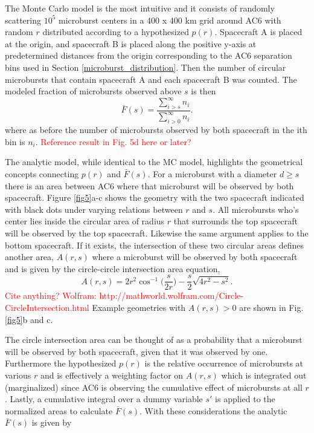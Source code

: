 \documentclass[draft]{agujournal2019}
\begin{document}
The Monte Carlo model is the most intuitive and it consists of randomly scattering $10^5$ microburst centers in a 400 x 400 km grid around AC6 with random $r$ distributed according to a hypothesized $p(r)$. Spacecraft A is placed at the origin, and spacecraft B is placed along the positive y-axis at predetermined distances from the origin corresponding to the AC6 separation bins used in Section \ref{microburst_distribution}. Then the number of circular microbursts that contain spacecraft A and each spacecraft B was counted. The modeled fraction of microbursts observed above $s$ is then
\begin{equation}
\bar{F}(s) = \frac{\displaystyle\sum_{i > s}^\infty n_{i} }{ \displaystyle\sum_{i > 0}^\infty n_{i} }.
\end{equation} where as before the number of microbursts observed by both spacecraft in the ith bin is $n_{i}$. \textcolor{red}{Reference result in Fig. 5d here or later?}

The analytic model, while identical to the MC model, highlights the geometrical concepts connecting $p(r)$ and $\bar{F}(s)$. For a microburst with a diameter $d \geq s$ there is an area between AC6 where that microburst will be observed by both spacecraft. Figure \ref{fig5}a-c shows the geometry with the two spacecraft indicated with black dots under varying relations between $r$ and $s$. All microbursts who's center lies inside the circular area of radius $r$ that surrounds the top spacecraft will be observed by the top spacecraft. Likewise the same argument applies to the bottom spacecraft. If it exists, the intersection of these two circular areas defines another area, $A(r, s)$ where a microburst will be observed by both spacecraft and is given by the circle-circle intersection area equation, 
\begin{equation}
A(r, s) = 2r^2 \cos^{-1}{\Big( \frac{s}{2r} \Big)} - \frac{s}{2} \sqrt{4r^2 - s^2}.
\end{equation} \textcolor{red}{Cite anything? Wolfram: http://mathworld.wolfram.com/Circle-CircleIntersection.html} Example geometries with $A(r, s) > 0$ are shown in Fig. \ref{fig5}b and c.

The circle intersection area can be thought of as a probability that a microburst will be observed by both spacecraft, given that it was observed by one. Furthermore the hypothesized $p(r)$ is the relative occurrence of microbursts at various $r$ and is effectively a weighting factor on $A(r, s)$ which is integrated out (marginalized) since AC6 is observing the cumulative effect of microbursts at all $r$. Lastly, a cumulative integral over a dummy variable $s'$ is applied to the normalized areas to calculate $\bar{F}(s)$. With these considerations the analytic $\bar{F}(s)$ is given by
\end{document}
